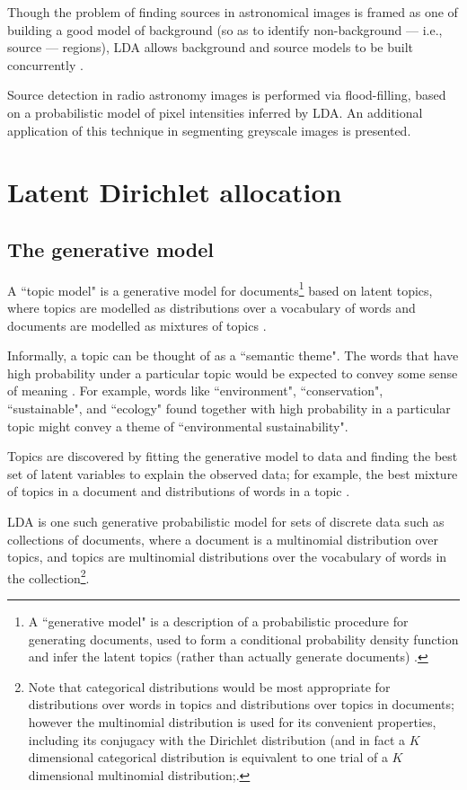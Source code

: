 Though the problem of finding sources in astronomical images is framed as one of building a good model of background (so as to identify non-background --- i.e., source --- regions), LDA allows background and source models to be built concurrently \cite{blei2003latent}.

Source detection in radio astronomy images is performed via flood-filling, based on a probabilistic model of pixel intensities inferred by LDA. An additional application of this technique in segmenting greyscale images is presented. 

\section{Latent Dirichlet allocation}\label{sec:LDA}

\subsection{The generative model}

A ``topic model" is a generative model for documents\footnote{A ``generative model" is a description of a probabilistic procedure for generating documents, used to form a conditional probability density function and infer the latent topics (rather than actually generate documents) \cite{steyvers2007probabilistic}.} based on latent topics, where topics are modelled as distributions over a vocabulary of words and documents are modelled as mixtures of topics \cite{steyvers2007probabilistic}. 

Informally, a topic can be thought of as a ``semantic theme". The words that have high probability under a particular topic would be expected to convey some sense of meaning \cite{blei2007supervised}. For example, words like ``environment", ``conservation", ``sustainable", and ``ecology" found together with high probability in a particular topic might convey a theme of ``environmental sustainability".

Topics are discovered by fitting the generative model to data and finding the best set of latent variables to explain the observed data; for example, the best mixture of topics in a document and distributions of words in a topic \cite{steyvers2007probabilistic}.

LDA \cite{blei2003latent} is one such generative probabilistic model for sets of discrete data such as collections of documents, where a document is a multinomial distribution over topics, and topics are multinomial distributions over the vocabulary of words in the collection\footnote{Note that categorical distributions would be most appropriate for distributions over words in topics and distributions over topics in documents; however the multinomial distribution is used for its convenient properties, including its conjugacy with the Dirichlet distribution (and in fact a $K$ dimensional categorical distribution is equivalent to one trial of a $K$ dimensional multinomial distribution;\cite{blei2003latent,diaconis1979conjugate,kuettel2010what}.}.

